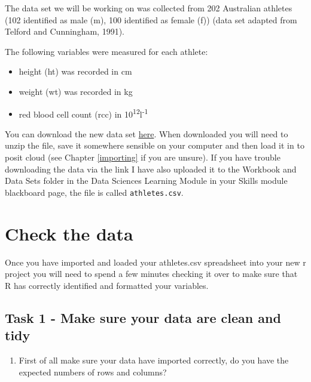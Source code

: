 \documentclass[
]{book}
\providecommand{\tightlist}{%
  \setlength{\itemsep}{0pt}\setlength{\parskip}{0pt}}
\begin{document}
The data set we will be working on was collected from 202 Australian athletes (102 identified as male (m), 100 identified as female (f)) (data set adapted from Telford and Cunningham, 1991).

The following variables were measured for each athlete:

\begin{itemize}
\tightlist
\item
  height (ht) was recorded in cm
\item
  weight (wt) was recorded in kg
\item
  red blood cell count (rcc) in 10\textsuperscript{12}l\textsuperscript{-1}
\end{itemize}

You can download the new data set \href{https://downgit.github.io/\#/home?url=https://github.com/ellenbell/4008Y/blob/main/data/athletes.csv}{here}. When downloaded you will need to unzip the file, save it somewhere sensible on your computer and then load it in to posit cloud (see Chapter \ref{importing} if you are unsure). If you have trouble downloading the data via the link I have also uploaded it to the Workbook and Data Sets folder in the Data Sciences Learning Module in your Skills module blackboard page, the file is called \texttt{athletes.csv}.

\hypertarget{check-the-data}{%
\section{Check the data}\label{check-the-data}}

Once you have imported and loaded your athletes.csv spreadsheet into your new r project you will need to spend a few minutes checking it over to make sure that R has correctly identified and formatted your variables.

\hypertarget{task-1---make-sure-your-data-are-clean-and-tidy}{%
\subsection{Task 1 - Make sure your data are clean and tidy}\label{task-1---make-sure-your-data-are-clean-and-tidy}}

\begin{enumerate}
\def\labelenumi{\arabic{enumi})}
\tightlist
\item
  First of all make sure your data have imported correctly, do you have the expected numbers of rows and columns?
\end{enumerate}
\end{document}
